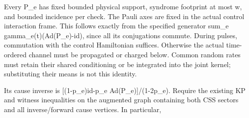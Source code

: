 \documentclass[
]{article}
\begin{document}
Every P\_e has fixed bounded physical support, syndrome footprint at
most w, and bounded incidence per check. The Pauli axes are fixed in the
actual control interaction frame. This follows exactly from the
specified generator sum\_e
g\allowbreak{}a\allowbreak{}m\allowbreak{}m\allowbreak{}a\allowbreak{}\_\allowbreak{}e\allowbreak{}(\allowbreak{}t\allowbreak{})\allowbreak{}(\allowbreak{}A\allowbreak{}d\allowbreak{}(\allowbreak{}P\allowbreak{}\_\allowbreak{}e\allowbreak{})\allowbreak{}-\allowbreak{}i\allowbreak{}d\allowbreak{})\allowbreak{},
since all its conjugations commute. During pulses, commutation with the
control Hamiltonian suffices. Otherwise the actual time-ordered channel
must be propagated or charged below. Common random rates must retain
their shared conditioning or be integrated into the joint kernel;
substituting their means is not this identity.

Its cause inverse is {[}(1-p\_e)id-p\_e
A\allowbreak{}d\allowbreak{}(\allowbreak{}P\allowbreak{}\_\allowbreak{}e\allowbreak{})\allowbreak{}]\allowbreak{}/\allowbreak{}(\allowbreak{}1\allowbreak{}-\allowbreak{}2\allowbreak{}p\allowbreak{}\_\allowbreak{}e\allowbreak{})\allowbreak{}.
Require the existing KP and witness inequalities on the augmented graph
containing both CSS sectors and all
i\allowbreak{}n\allowbreak{}v\allowbreak{}e\allowbreak{}r\allowbreak{}s\allowbreak{}e\allowbreak{}/\allowbreak{}f\allowbreak{}o\allowbreak{}r\allowbreak{}w\allowbreak{}a\allowbreak{}r\allowbreak{}d
cause vertices. In particular,
\end{document}
